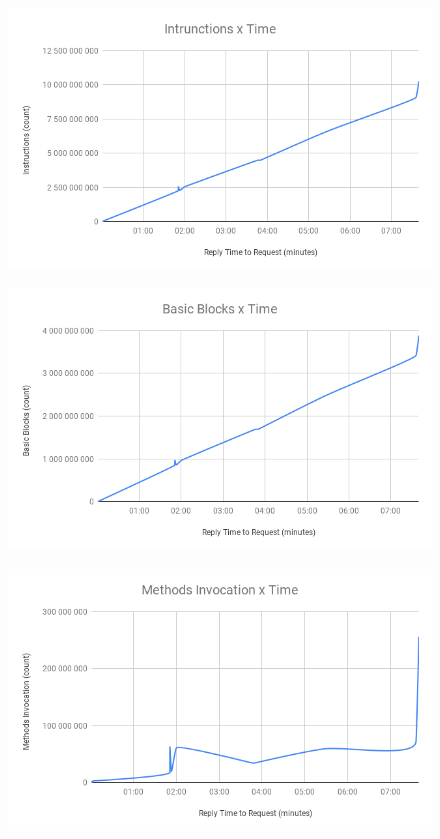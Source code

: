 \documentclass[times, 10pt,twocolumn]{article}
\begin{document}
\begin{figure}[!htb]
   \centering
   \includegraphics[width=\columnwidth]{images/Intrunctions.png}
   \caption{}
\end{figure}
\begin{figure}[!htb]
   \centering
   \includegraphics[width=\columnwidth]{images/BB.png}
   \caption{}
\end{figure}
\begin{figure}[!htb]
   \centering
   \includegraphics[width=\columnwidth]{images/Methods.png}
   \caption{}
\end{figure}
\end{document}
